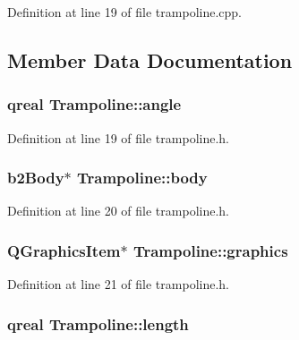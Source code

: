 Definition at line 19 of file trampoline.\+cpp.



\subsection{Member Data Documentation}
\subsubsection[{\texorpdfstring{angle}{angle}}]{\setlength{\rightskip}{0pt plus 5cm}qreal Trampoline\+::angle}\hypertarget{class_trampoline_ae2b2f0ba18c591bbcf360f368758edf7}{}\label{class_trampoline_ae2b2f0ba18c591bbcf360f368758edf7}


Definition at line 19 of file trampoline.\+h.

\subsubsection[{\texorpdfstring{body}{body}}]{\setlength{\rightskip}{0pt plus 5cm}b2\+Body$\ast$ Trampoline\+::body}\hypertarget{class_trampoline_a5640097c2fa1b82b69338e3e3d5fc18e}{}\label{class_trampoline_a5640097c2fa1b82b69338e3e3d5fc18e}


Definition at line 20 of file trampoline.\+h.

\subsubsection[{\texorpdfstring{graphics}{graphics}}]{\setlength{\rightskip}{0pt plus 5cm}Q\+Graphics\+Item$\ast$ Trampoline\+::graphics}\hypertarget{class_trampoline_a889e4c0143c14b47dc7575395356560a}{}\label{class_trampoline_a889e4c0143c14b47dc7575395356560a}


Definition at line 21 of file trampoline.\+h.

\subsubsection[{\texorpdfstring{length}{length}}]{\setlength{\rightskip}{0pt plus 5cm}qreal Trampoline\+::length}\hypertarget{class_trampoline_afc20b8e85af09d551c0278b2dcc1d35d}{}\label{class_trampoline_afc20b8e85af09d551c0278b2dcc1d35d}


